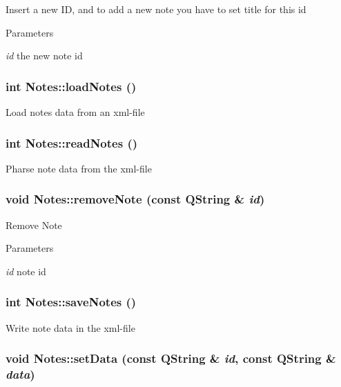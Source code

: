 \label{classNotes_a08ba874a751ba5fde4620ac5b5ff8037}
Insert a new ID, and to add a new note you have to set title for this id 
\begin{DoxyParams}{Parameters}
\item[{\em id}]the new note id \end{DoxyParams}
\hypertarget{classNotes_a91273d4a534e6426adb63bef043b4dbc}{
\subsubsection[{loadNotes}]{\setlength{\rightskip}{0pt plus 5cm}int Notes::loadNotes ()}}
\label{classNotes_a91273d4a534e6426adb63bef043b4dbc}
Load notes data from an xml-\/file \hypertarget{classNotes_aa47d6a7af0c2674fe6d3372280755d5b}{
\subsubsection[{readNotes}]{\setlength{\rightskip}{0pt plus 5cm}int Notes::readNotes ()}}
\label{classNotes_aa47d6a7af0c2674fe6d3372280755d5b}
Pharse note data from the xml-\/file \hypertarget{classNotes_a86b09275d829523b0eb42da6b008a580}{
\subsubsection[{removeNote}]{\setlength{\rightskip}{0pt plus 5cm}void Notes::removeNote (const QString \& {\em id})}}
\label{classNotes_a86b09275d829523b0eb42da6b008a580}
Remove Note 
\begin{DoxyParams}{Parameters}
\item[{\em id}]note id \end{DoxyParams}
\hypertarget{classNotes_af76c3652cd25371b7233eb84079b39a0}{
\subsubsection[{saveNotes}]{\setlength{\rightskip}{0pt plus 5cm}int Notes::saveNotes ()}}
\label{classNotes_af76c3652cd25371b7233eb84079b39a0}
Write note data in the xml-\/file \hypertarget{classNotes_a176683f801c998ff85f667947c41c7d9}{
\subsubsection[{setData}]{\setlength{\rightskip}{0pt plus 5cm}void Notes::setData (const QString \& {\em id}, \/  const QString \& {\em data})}}
